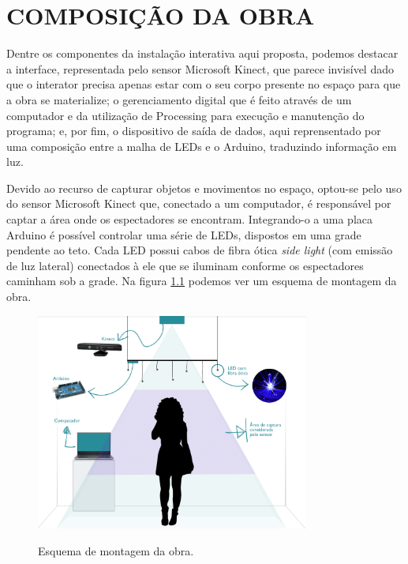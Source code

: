 \chapter{COMPOSIÇÃO DA OBRA}

Dentre os componentes da instalação interativa aqui proposta, podemos destacar a interface, representada pelo sensor Microsoft Kinect, que parece invisível dado que o interator precisa apenas estar com o seu corpo presente no espaço para que a obra se materialize; o gerenciamento digital que é feito através de um computador e da utilização de Processing para execução e manutenção do programa; e, por fim, o dispositivo de saída de dados, aqui reprensentado por uma composição entre a malha de LEDs e o Arduino, traduzindo informação em luz.

Devido ao recurso de capturar objetos e movimentos no espaço, optou-se pelo uso do sensor Microsoft Kinect que, conectado a um computador, é responsável por captar a área onde os espectadores se encontram. Integrando-o a uma placa Arduino é possível controlar uma série de LEDs, dispostos em uma grade pendente ao teto. Cada LED possui cabos de fibra ótica \textit{side light} (com emissão de luz lateral) conectados à ele que se iluminam conforme os espectadores caminham sob a grade. Na figura \ref{fig:esquema} podemos ver um esquema de montagem da obra.

\begin{figure}[H]
    \centering
    \caption{Esquema de montagem da obra.}
	\vspace*{0,2cm}
    \includegraphics[width=0.8\textwidth]{./04-figuras/esquema}
    \label{fig:esquema}
\end{figure}
\vspace*{-0,9cm}
{\raggedright {}}\\

